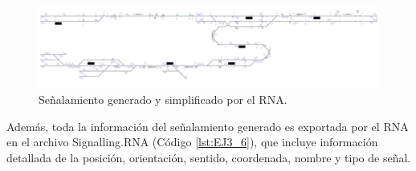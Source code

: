 	\begin{figure}[H]
		\centering
		\includegraphics[width=1\textwidth]{resultados-obtenidos/ejemplo3/images/3_RNA.png}
		\centering\caption{Señalamiento generado y simplificado por el RNA.}
		\label{fig:EJ3_7}
	\end{figure}
	
	Además, toda la información del señalamiento generado es exportada por el RNA en el archivo Signalling.RNA (Código \ref{lst:EJ3_6}), que incluye información detallada de la posición, orientación, sentido, coordenada, nombre y tipo de señal.
	
